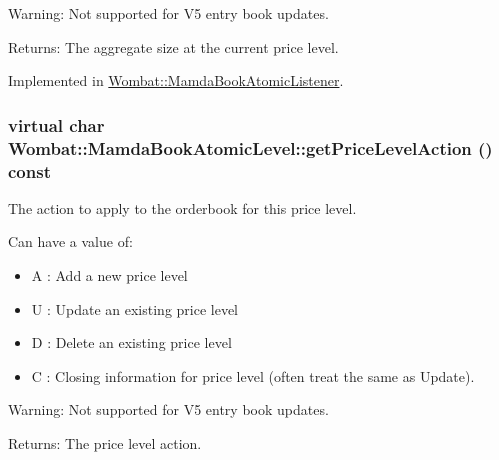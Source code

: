 \begin{Desc}
\item[Warning:]Not supported for V5 entry book updates.\end{Desc}
\begin{Desc}
\item[Returns:]The aggregate size at the current price level. \end{Desc}


Implemented in \hyperlink{classWombat_1_1MamdaBookAtomicListener_f94e0c100149bd2543be4c5c5ae891a2}{Wombat::Mamda\-Book\-Atomic\-Listener}.\hypertarget{classWombat_1_1MamdaBookAtomicLevel_01015a77e67f21af4f1b53f25d6df2f0}{
\subsubsection[getPriceLevelAction]{\setlength{\rightskip}{0pt plus 5cm}virtual char Wombat::Mamda\-Book\-Atomic\-Level::get\-Price\-Level\-Action () const}}
\label{classWombat_1_1MamdaBookAtomicLevel_01015a77e67f21af4f1b53f25d6df2f0}


The action to apply to the orderbook for this price level. 

Can have a value of: \begin{itemize}
\item A : Add a new price level \item U : Update an existing price level \item D : Delete an existing price level \item C : Closing information for price level (often treat the same as Update). \end{itemize}


\begin{Desc}
\item[Warning:]Not supported for V5 entry book updates.\end{Desc}
\begin{Desc}
\item[Returns:]The price level action. \end{Desc}



